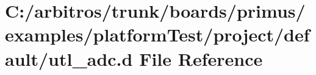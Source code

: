 \hypertarget{boards_2primus_2examples_2platform_test_2project_2default_2utl__adc_8d}{\section{C\-:/arbitros/trunk/boards/primus/examples/platform\-Test/project/default/utl\-\_\-adc.d File Reference}
\label{boards_2primus_2examples_2platform_test_2project_2default_2utl__adc_8d}
}
